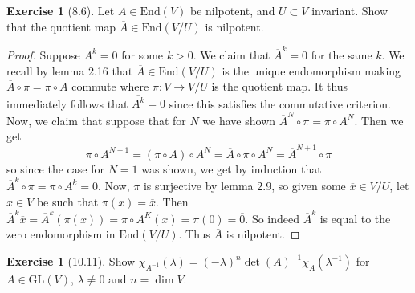 \documentclass[reqno]{amsart}
\theoremstyle{definition}
\newtheorem{exercise}[theorem]{Exercise}
\theoremstyle{remark}
\newcommand{\End}{{\mathrm{End}}}
\begin{document}
    \begin{exercise}[8.6]
       Let $A \in \End (V)$ be nilpotent, and
       $U \subset V$ invariant. Show that the quotient
       map $\overline{A} \in \End \left( V/U \right) $ 
       is nilpotent.
    \end{exercise}

    \begin{proof}
        Suppose $A^{k} = 0$ for some $k > 0$.
        We claim that $\overline{A}^{k} = 0$ for the same $k$.
        We recall by lemma 2.16 that 
        $\overline{A} \in \End \left( V/U  \right) $ is
        the unique endomorphism making
        $\overline{A} \circ \pi = \pi \circ A$ commute
        where $\pi \colon
        V \to V / U$ is the quotient map.
        It thus immediately follows that
        $\overline{A^{k}} = 0$ since
        this satisfies the commutative criterion. 
        Now, we claim
        that suppose that for $N$ we have shown
        $\overline{A}^{N} \circ \pi = \pi \circ A^{N}$. Then
        we get
        \[
            \pi \circ A^{N+1}
            = \left( \pi \circ A \right) \circ A^{N}
            = \overline{A} \circ \pi \circ A^{N}
            = \overline{A}^{N+1} \circ \pi
        \] 
        so since the case for $N = 1$ was shown, we
        get by induction that
        $\overline{A}^{k} \circ \pi = 
        \pi \circ A^{k} = 0$.
        Now, $\pi $ is surjective by lemma
        2.9, so given some 
        $\overline{x} \in 
        V / U$, let $x \in V$ be such that
        $\pi (x) = \overline{x}$. Then
        $\overline{A}^{k} \overline{x}
        = \overline{A}^{k} \left( \pi (x) \right) 
        = \pi \circ A^{K} (x)
        = \pi (0) = \overline{0}$. So
        indeed $\overline{A}^{k}$ is equal to
        the zero endomorphism in
        $\End \left( V /U \right) $. Thus
        $\overline{A}$ is nilpotent.

    \end{proof}


    \begin{exercise}[10.11]
        Show $\chi_{A^{-1}} \left( \lambda \right) 
        = \left( - \lambda \right)^{n}
        \det (A)^{-1} \chi_{A} \left( \lambda^{-1} \right) $ 
        for $A \in \text{GL} (V)$, $\lambda \neq 0$ and
        $n = \dim V$.
    \end{exercise}
\end{document}
